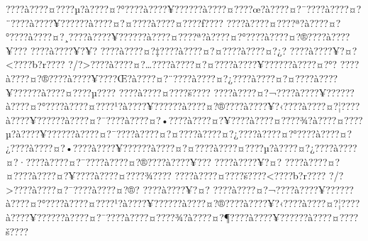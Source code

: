 \documentclass[11pt, openany]{book}
\begin{document}
{{{{{{{{{{{{{{{{{{{{{{{{{{{{{{{{{{{{{{{{{{{{{{{{{{{{{{{{{{{{{{{{{{{{{{{{{{{{{{{{{{{{{{{{{{{{{{{{{{{{{{{{{{{{{???\textbar{}?à???\textbar{}?¤???\textbar{}?µ?à???\textbar{}?¤?°???\textbar{}?à???\textbar{}?¥?????\textbar{}?à???\textbar{}?¤???\textbar{}?œ?à???\textbar{}?¤?¯???\textbar{}?à???\textbar{}?¤?¨???\textbar{}?à???\textbar{}?¥?????\textbar{}?à???\textbar{}?¤?¤???\textbar{}?à???\textbar{}?¤???\textbar{}?ƒ???\textbar{}?
???\textbar{}?à???\textbar{}?¤???\textbar{}?ª?à???\textbar{}?¤?°???\textbar{}?à???\textbar{}?¤?¸???\textbar{}?à???\textbar{}?¥?????\textbar{}?à???\textbar{}?¤???\textbar{}?ª?à???\textbar{}?¤?°???\textbar{}?à???\textbar{}?¤?®???\textbar{}?à???\textbar{}?¥???
???\textbar{}?à???\textbar{}?¥?¥?
???\textbar{}?à???\textbar{}?¤?‡???\textbar{}?à???\textbar{}?¤?¤???\textbar{}?à???\textbar{}?¤?¿?
???\textbar{}?à???\textbar{}?¥?¤?\textless{}???\textbar{}?b?r???\textbar{}?
?/?\textgreater{}???\textbar{}?à???\textbar{}?¤?\ldots{}???\textbar{}?à???\textbar{}?¤?¤???\textbar{}?à???\textbar{}?¥?????\textbar{}?à???\textbar{}?¤?°?
???\textbar{}?à???\textbar{}?¤?®???\textbar{}?à???\textbar{}?¥???\textbar{}?Œ?à???\textbar{}?¤?¨???\textbar{}?à???\textbar{}?¤?¿???\textbar{}?à???\textbar{}?¤?¤???\textbar{}?à???\textbar{}?¥?????\textbar{}?à???\textbar{}?¤???\textbar{}?µ???\textbar{}?
???\textbar{}?à???\textbar{}?¤???\textbar{}?š???\textbar{}?
???\textbar{}?à???\textbar{}?¤?¬???\textbar{}?à???\textbar{}?¥?????\textbar{}?à???\textbar{}?¤?°???\textbar{}?à???\textbar{}?¤???\textbar{}?¹?à???\textbar{}?¥?????\textbar{}?à???\textbar{}?¤?®???\textbar{}?à???\textbar{}?¥?‹???\textbar{}?à???\textbar{}?¤?¦???\textbar{}?à???\textbar{}?¥?????\textbar{}?à???\textbar{}?¤?¯???\textbar{}?à???\textbar{}?¤?•???\textbar{}?à???\textbar{}?¤?¥???\textbar{}?à???\textbar{}?¤???\textbar{}?¾?à???\textbar{}?¤???\textbar{}?µ?à???\textbar{}?¥?????\textbar{}?à???\textbar{}?¤?¯???\textbar{}?à???\textbar{}?¤?¤???\textbar{}?à???\textbar{}?¤?¿???\textbar{}?à???\textbar{}?¤?°???\textbar{}?à???\textbar{}?¤?¿???\textbar{}?à???\textbar{}?¤?•???\textbar{}?à???\textbar{}?¥?????\textbar{}?à???\textbar{}?¤?¤???\textbar{}?à???\textbar{}?¤???\textbar{}?µ?à???\textbar{}?¤?¿???\textbar{}?à???\textbar{}?¤?·???\textbar{}?à???\textbar{}?¤?¯???\textbar{}?à???\textbar{}?¤?®???\textbar{}?à???\textbar{}?¥???
???\textbar{}?à???\textbar{}?¥?¤?
???\textbar{}?à???\textbar{}?¤?¤???\textbar{}?à???\textbar{}?¤?¥???\textbar{}?à???\textbar{}?¤???\textbar{}?¾???\textbar{}?
???\textbar{}?à???\textbar{}?¤???\textbar{}?š???\textbar{}?\textless{}???\textbar{}?b?r???\textbar{}?
?/?\textgreater{}???\textbar{}?à???\textbar{}?¤?¯???\textbar{}?à???\textbar{}?¤?®?
???\textbar{}?à???\textbar{}?¥?¤?
???\textbar{}?à???\textbar{}?¤?¬???\textbar{}?à???\textbar{}?¥?????\textbar{}?à???\textbar{}?¤?°???\textbar{}?à???\textbar{}?¤???\textbar{}?¹?à???\textbar{}?¥?????\textbar{}?à???\textbar{}?¤?®???\textbar{}?à???\textbar{}?¥?‹???\textbar{}?à???\textbar{}?¤?¦???\textbar{}?à???\textbar{}?¥?????\textbar{}?à???\textbar{}?¤?¯???\textbar{}?à???\textbar{}?¤???\textbar{}?¾?à???\textbar{}?¤?¶???\textbar{}?à???\textbar{}?¥?????\textbar{}?à???\textbar{}?¤???\textbar{}?š???\textbar{}?
}}}}}}}}}}}}}}}}}}}}}}}}}}}}}}}}}}}}}}}}}}}}}}}}}}}}}}}}}}}}}}}}}}}}}}}}}}}}}}}}}}}}}}}}}}}}}}}}}}}}}}}}}}}}}
\end{document}

